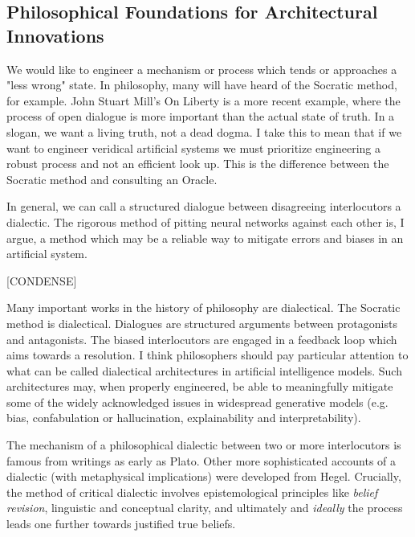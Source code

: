 \subsection{Philosophical Foundations for Architectural Innovations}

We would like to engineer a mechanism or process which tends or approaches a "less wrong" state.  In philosophy, many will have heard of the Socratic method, for example.  John Stuart Mill's On Liberty is a more recent example, where the process of open dialogue is more important than the actual state of truth.  In a slogan, we want a living truth, not a dead dogma.  I take this to mean that if we want to engineer veridical artificial systems we must prioritize engineering a robust process and not an efficient look up.  This is the difference between the Socratic method and consulting an Oracle.

In general, we can call a structured dialogue between disagreeing interlocutors a dialectic.  The rigorous method of pitting neural networks against each other is, I argue, a method which may be a reliable way to mitigate errors and biases in an artificial system. 


[CONDENSE]

Many important works in the history of philosophy are dialectical.  The Socratic method is dialectical.  Dialogues are structured arguments between protagonists and antagonists.  The biased interlocutors are engaged in a feedback loop which aims towards a resolution.  I think philosophers should pay particular attention to what can be called dialectical architectures in artificial intelligence models.  Such architectures may, when properly engineered, be able to meaningfully mitigate some of the widely acknowledged issues in widespread generative models (e.g. bias, confabulation or hallucination, explainability and interpretability).



The mechanism of a philosophical dialectic between two or more interlocutors is famous from writings as early as Plato.  Other more sophisticated accounts of a dialectic (with metaphysical implications) were developed from Hegel.  \citep{sep-hegel-dialectics}  Crucially, the method of critical dialectic involves epistemological principles like \emph{belief revision}, linguistic and conceptual clarity, and ultimately and \emph{ideally} the process leads one further towards justified true beliefs. 








